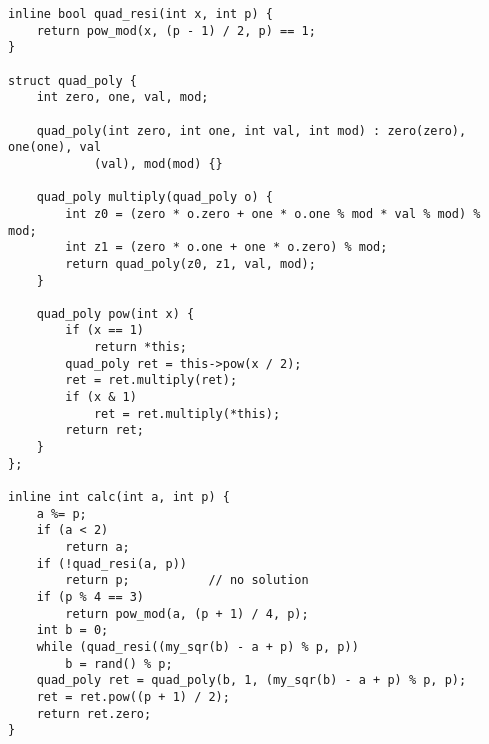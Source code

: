 \begin{lstlisting}
inline bool quad_resi(int x, int p) {
	return pow_mod(x, (p - 1) / 2, p) == 1;
}

struct quad_poly {
	int zero, one, val, mod;

	quad_poly(int zero, int one, int val, int mod) : zero(zero), one(one), val
			(val), mod(mod) {}

	quad_poly multiply(quad_poly o) {
		int z0 = (zero * o.zero + one * o.one % mod * val % mod) % mod;
		int z1 = (zero * o.one + one * o.zero) % mod;
		return quad_poly(z0, z1, val, mod);
	}

	quad_poly pow(int x) {
		if (x == 1)
			return *this;
		quad_poly ret = this->pow(x / 2);
		ret = ret.multiply(ret);
		if (x & 1)
			ret = ret.multiply(*this);
		return ret;
	}
};

inline int calc(int a, int p) {
	a %= p;
	if (a < 2)
		return a;
	if (!quad_resi(a, p))
		return p;			// no solution
	if (p % 4 == 3)
		return pow_mod(a, (p + 1) / 4, p);
	int b = 0;
	while (quad_resi((my_sqr(b) - a + p) % p, p))
		b = rand() % p;
	quad_poly ret = quad_poly(b, 1, (my_sqr(b) - a + p) % p, p);
	ret = ret.pow((p + 1) / 2);
	return ret.zero;
}
\end{lstlisting}
